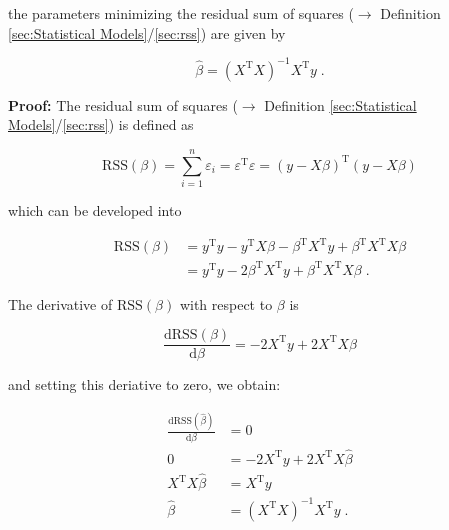 \documentclass[a4paper,12pt,twoside]{book}
\begin{document}
the parameters minimizing the residual sum of squares ($\rightarrow$ Definition \ref{sec:Statistical Models}/\ref{sec:rss}) are given by

\begin{equation} \label{eq:mlr-ols2-OLS}
\hat{\beta} = (X^\mathrm{T} X)^{-1} X^\mathrm{T} y \; .
\end{equation}


\vspace{1em}
\textbf{Proof:} The residual sum of squares ($\rightarrow$ Definition \ref{sec:Statistical Models}/\ref{sec:rss}) is defined as

\begin{equation} \label{eq:mlr-ols2-RSS}
\mathrm{RSS}(\beta) = \sum_{i=1}^n \varepsilon_i = \varepsilon^\mathrm{T} \varepsilon = (y-X\beta)^\mathrm{T} (y-X\beta)
\end{equation}

which can be developed into

\begin{equation} \label{eq:mlr-ols2-RSS-dev}
\begin{split}
\mathrm{RSS}(\beta) &= y^\mathrm{T} y - y^\mathrm{T} X \beta - \beta^\mathrm{T} X^\mathrm{T} y + \beta^\mathrm{T} X^\mathrm{T} X \beta \\
&= y^\mathrm{T} y - 2 \beta^\mathrm{T} X^\mathrm{T} y + \beta^\mathrm{T} X^\mathrm{T} X \beta \; .
\end{split}
\end{equation}

The derivative of $\mathrm{RSS}(\beta)$ with respect to $\beta$ is

\begin{equation} \label{eq:mlr-ols2-RSS-der}
\frac{\mathrm{d}\mathrm{RSS}(\beta)}{\mathrm{d}\beta} = - 2 X^\mathrm{T} y + 2 X^\mathrm{T} X \beta
\end{equation}

and setting this deriative to zero, we obtain:

\begin{equation} \label{eq:mlr-ols2-OLS-qed}
\begin{split}
\frac{\mathrm{d}\mathrm{RSS}(\hat{\beta})}{\mathrm{d}\beta} &= 0 \\
0 &= - 2 X^\mathrm{T} y + 2 X^\mathrm{T} X \hat{\beta} \\
X^\mathrm{T} X \hat{\beta} &= X^\mathrm{T} y \\
\hat{\beta} &= (X^\mathrm{T} X)^{-1} X^\mathrm{T} y \; .
\end{split}
\end{equation}
\end{document}
